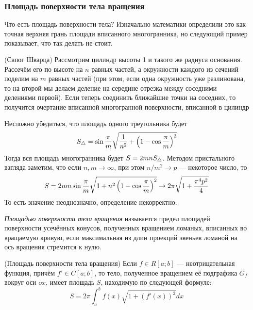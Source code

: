 \subsubsection{Площадь поверхности тела вращения}

\begin{note}
	Что есть площадь поверхности тела? Изначально математики определили это как точная верхняя грань площади вписанного многогранника, но следующий пример показывает, что так делать не стоит.
\end{note}

\begin{example} (Сапог Шварца)
	Рассмотрим цилиндр высоты 1 и такого же радиуса основания. Рассечём его по высоте на $n$ равных частей, а окружности каждого из сечений поделим на $m$ равных частей (при этом, если одна окружность уже разлинована, то на второй мы делаем деление на середине отрезка между соседними делениями первой). Если теперь соединить ближайшие точки на соседних, то получится очертание вписанной многогранной поверхности, вписанной в цилиндр
	
	Несложно убедиться, что площадь одного треугольника будет
	\[
		S_\triangle = \sin \frac{\pi}{m} \sqrt{\frac{1}{n^2} + \left(1 - \cos \frac{\pi}{m}\right)^2}
	\]
	Тогда вся площадь многогранника будет $S = 2mn S_\triangle$. Методом пристального взгляда заметим, что если $n, m \to \infty$, при этом $n / m^2 \to p$ --- некоторое число, то
	\[
		S = 2mn\sin \frac{\pi}{m} \sqrt{1 + n^2\left(1 - \cos \frac{\pi}{m}\right)^2} \to 2\pi \sqrt{1 + \frac{\pi^4 p^2}{4}}
	\]
	То есть значение неоднозначно, определение некорректно.
\end{example}

\begin{definition}
	\textit{Площадью поверхности тела вращения} называется предел площадей поверхности усечённых конусов, полученных вращением ломаных, вписанных во вращаемую кривую, если максимальная из длин проекций звеньев ломаной на ось вращения стремится к нулю.
\end{definition}

\begin{theorem} (Площадь поверхности тела вращения)
	Если $f \in R[a; b]$ --- неотрицательная функция, причём $f' \in C[a; b]$, то тело, полученное вращением её подграфика $G_f$ вокруг оси $ox$, имеет площадь $S$, находимую по следующей формуле:
	\[
		S = 2\pi \int_a^b f(x) \sqrt{1 + (f'(x))^2}dx
	\]
\end{theorem}


